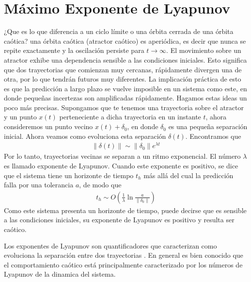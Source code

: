 \section{Máximo Exponente de Lyapunov}
\label{secMLE}

¿Que es lo que diferencia a un ciclo límite o una órbita cerrada de una órbita caótica? una órbita caótica (atractor caótico) es aperiódica, es decir que nunca se repite exactamente y la oscilación persiste para $t \to \infty$.
El movimiento sobre un atractor exhibe una dependencia sensible a las condiciones iniciales.
Esto significa que dos trayectorias que comienzan muy cercanas, rápidamente divergen una de otra, por lo que tendrán futuros muy diferentes.
La implicación práctica de esto es que la predicción a largo plazo se vuelve imposible en un sistema como este, en donde pequeñas incertezas son amplificadas rápidamente.
Hagamos estas ideas un poco más precisas.
Supongamos que te tenemos una trayectoria sobre el atractor y un punto $x(t)$ perteneciente a dicha trayectoria en un instante $t$, ahora consideremos un punto vecino $x(t) + \delta_0$, en donde $\delta_0$ es una pequeña separación inicial.
Ahora veamos como evoluciona esta separación $\delta(t)$.
Encontramos que
%
\begin{eqnarray}
\lVert \delta(t) \rVert \sim \lVert \delta_0 \rVert e^{\lambda t}
\end{eqnarray}
%
Por lo tanto, trayectorias vecinas se separan a un ritmo exponencial.
El número $\lambda$ es llamado exponente de Lyapunov.
Cuando este exponente es positivo, se dice que el sistema tiene un horizonte de tiempo $t_h$ más allá del cual la predicción falla por una tolerancia $a$, de modo que
%
\begin{eqnarray}
t_h \sim O ( \frac{1}{\lambda} \ln \frac{a}{\lVert \delta_0 \rVert})
\end{eqnarray}
%
Como este sistema presenta un horizonte de tiempo, puede decirse que es sensible a las condiciones iniciales, su exponente de Lyapunov es positivo y resulta ser caótico.

Los exponentes de Lyapunov son quantificadores que caracterizan como evoluciona la separación entre dos trayectorias \cite{Sprott2003}.
En general es bien conocido que el comportamiento caótico está principalmente caracterizado por los números de Lyapunov de la dinamica del sistema.

